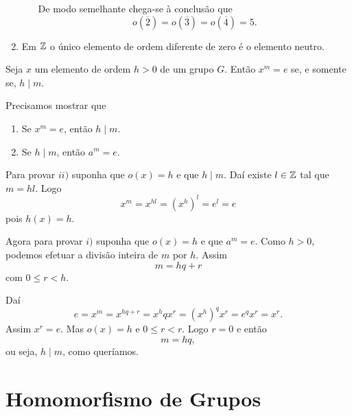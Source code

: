 \begin{exemplos}
\begin{enumerate}[label={\arabic*})]
\begin{itemize}
            De modo semelhante chega-se à conclusão que
            \[
                o(\overline{2}) = o(\overline{3}) = o(\overline{4}) = 5.
            \]
        \end{itemize}

        \item Em $\mathbb{Z}$ o único elemento de ordem diferente de zero é o elemento neutro.
    \end{enumerate}
\end{exemplos}

\begin{proposicao}
    Seja $x$ um elemento de ordem $h > 0$ de um grupo $G$. Então $x^m = e$ se, e somente se, $h \mid m$.
\end{proposicao}
\begin{prova}
    Precisamos mostrar que
    \begin{enumerate}[label={\roman*})]
        \item Se $x^m = e$, então $h \mid m$.

        \item Se $h \mid m$, então $a^m = e$.
    \end{enumerate}

    Para provar $ii)$ suponha que $o(x) = h$ e que $h \mid m$. Daí existe $l \in \mathbb{Z}$ tal que $m = hl$. Logo
    \[
        x^m = x^{hl} = (x^h)^l = e^l = e
    \]
    pois $h(x) = h$.

    Agora para provar $i)$ suponha que $o(x) = h$ e que $a^m = e$. Como $h > 0$, podemos efetuar a divisão inteira de $m$ por $h$. Assim
    \[
        m = hq + r
    \]
    com $0 \le r < h$.

    Daí
    \[
        e = x^m = x^{hq + r} = x^hqx^r = (x^h)^qx^r = e^qx^r = x^r.
    \]
    Assim $x^r = e$. Mas $o(x) = h$ e $0 \le r < r$. Logo $r = 0$ e então
    \[
        m = hq,
    \]
    ou seja, $h \mid m$, como queríamos.
\end{prova}

\section{Homomorfismo de Grupos} %
\label{sec:homomorfismo_de_grupos}


